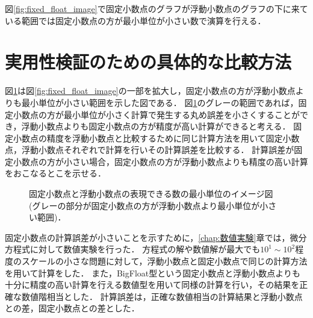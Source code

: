 図\ref{fig:fixed_float_image}で固定小数点のグラフが浮動小数点のグラフの下に来ている範囲では固定小数点の方が最小単位が小さい数で演算を行える．

\section{実用性検証のための具体的な比較方法}
図\ref{fig:fixed_float_image_zoom}は図\ref{fig:fixed_float_image}の一部を拡大し，固定小数点の方が浮動小数点よりも最小単位が小さい範囲を示した図である．
図\ref{fig:fixed_float_image_zoom}のグレーの範囲であれば，固定小数点の方が最小単位が小さく計算で発生する丸め誤差を小さくすることができ，浮動小数点よりも固定小数点の方が精度が高い計算ができると考える．
固定小数点の精度を浮動小数点と比較するために同じ計算方法を用いて固定小数点，浮動小数点それぞれで計算を行いその計算誤差を比較する．
計算誤差が固定小数点の方が小さい場合，固定小数点の方が浮動小数点よりも精度の高い計算をおこなるとこを示せる．
\begin{figure}[H]
    \centering
    \caption{固定小数点と浮動小数点の表現できる数の最小単位のイメージ図(グレーの部分が固定小数点の方が浮動小数点より最小単位が小さい範囲)．}
    \label{fig:fixed_float_image_zoom}
\end{figure}

固定小数点の計算誤差が小さいことを示すために，\ref{chap:数値実験}章では，微分方程式に対して数値実験を行った．
方程式の解や数値解が最大でも$10^1 \sim 10^2$程度のスケールの小さな問題に対して，浮動小数点と固定小数点で同じの計算方法を用いて計算をした．
また，BigFloat型という固定小数点と浮動小数点よりも十分に精度の高い計算を行える数値型を用いて同様の計算を行い，その結果を正確な数値階相当とした．
計算誤差は，正確な数値相当の計算結果と浮動小数点との差，固定小数点との差とした．